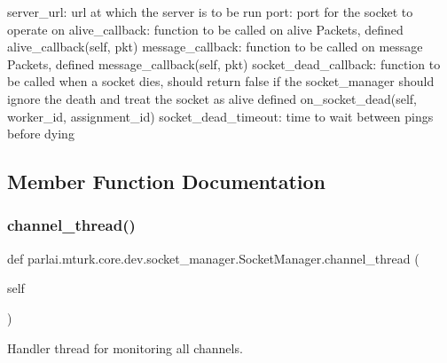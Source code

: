 \begin{DoxyVerb}server_url:           url at which the server is to be run
port:                 port for the socket to operate on
alive_callback:       function to be called on alive Packets, defined
               alive_callback(self, pkt)
message_callback:     function to be called on message Packets, defined
               message_callback(self, pkt)
socket_dead_callback: function to be called when a socket dies, should
              return false if the socket_manager should ignore
              the death and treat the socket as alive defined
               on_socket_dead(self, worker_id, assignment_id)
socket_dead_timeout:  time to wait between pings before dying
\end{DoxyVerb}
 

\subsection{Member Function Documentation}
\mbox{\label{classparlai_1_1mturk_1_1core_1_1dev_1_1socket__manager_1_1SocketManager_a77dba972ee1a8e3dc165d2531864d974}} 
\subsubsection{\texorpdfstring{channel\+\_\+thread()}{channel\_thread()}}
{\footnotesize\ttfamily def parlai.\+mturk.\+core.\+dev.\+socket\+\_\+manager.\+Socket\+Manager.\+channel\+\_\+thread (\begin{DoxyParamCaption}\item[{}]{self }\end{DoxyParamCaption})}

\begin{DoxyVerb}Handler thread for monitoring all channels.
\end{DoxyVerb}
 \mbox{\label{classparlai_1_1mturk_1_1core_1_1dev_1_1socket__manager_1_1SocketManager_ab8fb515ceb7db7a1c0395ca210593383}} 
